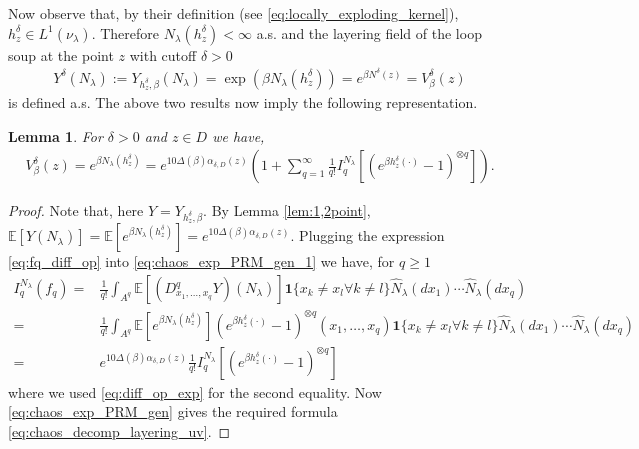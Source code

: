 \documentclass[a4paper, 11pt, reqno]{amsart}
\theoremstyle{definition} \newtheorem{defn}{Definition}[section]
\theoremstyle{remark} \newtheorem{rem}[defn]{Remark}
\theoremstyle{remark} \newtheorem*{rem*}{Remark}
\theoremstyle{plain} \newtheorem{thm}[defn]{Theorem}
\theoremstyle{plain} \newtheorem{lem}[defn]{Lemma}
\theoremstyle{plain} \newtheorem{prop}[defn]{Proposition}
\theoremstyle{plain} \newtheorem{cor}[defn]{Corollary}
\theoremstyle{remark} \newtheorem{exm}[defn]{\textbf{Example}}
\theoremstyle{remark} \newtheorem{exms}[defn]{\textbf{Examples}}
\theoremstyle{remark} \newtheorem*{bl}{}
\numberwithin{equation}{section} %
\newcommand{\E}{\mathbb{E}}
\newcommand{\ind}{\mathbf{1}}
\begin{document}
	Now observe that, by their definition (see \eqref{eq:locally_exploding_kernel}), $h^{\delta}_z \in L^1(\nu_{\lambda})$. Therefore $N_{\lambda}(h^{\delta}_z ) < \infty$ a.s. and the layering field of the loop soup at the point $z$ with cutoff $\delta >0$
	\begin{align}
		Y^{\delta}(N_{\lambda}) := Y_{h^{\delta}_z, \beta} (N_{\lambda}) = \exp\left( \beta N_{\lambda}(h^{\delta}_z)\right)  = e^{\beta N^{\delta}(z)} = V^{\delta}_{\beta}(z)
	\end{align} is defined a.s. The above two results now imply the following representation.		\begin{lem}\label{lem:chaos_decomp_layering_uv}	For $\delta>0$ and $z \in D$ we have,	\begin{align}\label{eq:chaos_decomp_layering_uv}
			V^{\delta}_{\beta}(z) = e^{\beta N_{\lambda}(h^{\delta}_z)} = e^{10\Delta(\beta) \alpha_{\delta, D}(z) } \left( 1 + \sum_{q=1}^{\infty} \frac{1}{q!} I_q^{N_{\lambda}} \left[(e^{\beta h^{\delta}_z(\cdot)}-1)^{\otimes q}\right]\right).
		\end{align}
	\end{lem}

    \begin{proof}
        Note that, here $Y = Y_{h^{\delta}_z, \beta}$. By Lemma \ref{lem:1,2point}, $\E[Y(N_{\lambda})] = \E\left[ e^{\beta N_{\lambda}(h^{\delta}_z)}\right] = e^{10\Delta(\beta) \alpha_{\delta, D}(z) }$. Plugging the expression \eqref{eq:fq_diff_op} into \eqref{eq:chaos_exp_PRM_gen_1} we have, for $q\ge 1$
		\begin{align}
			I^{N_{\lambda}}_q (f_q) = & \frac{1}{q!} \int_{A^q} \E[(D^q_{x_1, \ldots, x_q} Y)(N_{\lambda})] \ind\{x_k \neq x_l \forall k\neq l\} \hat{N}_{\lambda}(dx_1) \cdots \hat{N}_{\lambda}(dx_q)
			\nonumber \\
			= &  \frac{1}{q!} \int_{A^q} \E[e^{\beta N_{\lambda}(h^{\delta}_z)}] (e^{\beta h^{\delta}_z(\cdot)}-1)^{\otimes q} (x_1, \ldots, x_q) \ind\{x_k \neq x_l \forall k\neq l\} \hat{N}_{\lambda}(dx_1) \cdots \hat{N}_{\lambda}(dx_q)
			\nonumber \\
			= & e^{10\Delta(\beta) \alpha_{\delta, D}(z) } \frac{1}{q!} I^{N_{\lambda}}_q [(e^{\beta h^{\delta}_z(\cdot)}-1)^{\otimes q}]
		\end{align} 
		where we used \eqref{eq:diff_op_exp} for the second equality. Now \eqref{eq:chaos_exp_PRM_gen} gives the required formula \eqref{eq:chaos_decomp_layering_uv}.
    \end{proof}
    
\end{document}
